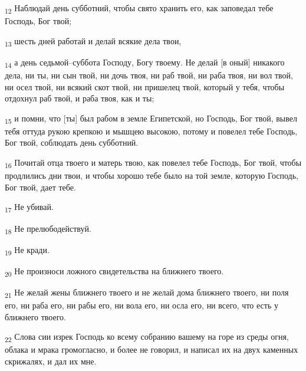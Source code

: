 \begin{tcolorbox}
\textsubscript{12} Наблюдай день субботний, чтобы свято хранить его, как заповедал тебе Господь, Бог твой;
\end{tcolorbox}
\begin{tcolorbox}
\textsubscript{13} шесть дней работай и делай всякие дела твои,
\end{tcolorbox}
\begin{tcolorbox}
\textsubscript{14} а день седьмой--суббота Господу, Богу твоему. Не делай [в оный] никакого дела, ни ты, ни сын твой, ни дочь твоя, ни раб твой, ни раба твоя, ни вол твой, ни осел твой, ни всякий скот твой, ни пришелец твой, который у тебя, чтобы отдохнул раб твой, и раба твоя, как и ты;
\end{tcolorbox}
\begin{tcolorbox}
\textsubscript{15} и помни, что [ты] был рабом в земле Египетской, но Господь, Бог твой, вывел тебя оттуда рукою крепкою и мышцею высокою, потому и повелел тебе Господь, Бог твой, соблюдать день субботний.
\end{tcolorbox}
\begin{tcolorbox}
\textsubscript{16} Почитай отца твоего и матерь твою, как повелел тебе Господь, Бог твой, чтобы продлились дни твои, и чтобы хорошо тебе было на той земле, которую Господь, Бог твой, дает тебе.
\end{tcolorbox}
\begin{tcolorbox}
\textsubscript{17} Не убивай.
\end{tcolorbox}
\begin{tcolorbox}
\textsubscript{18} Не прелюбодействуй.
\end{tcolorbox}
\begin{tcolorbox}
\textsubscript{19} Не кради.
\end{tcolorbox}
\begin{tcolorbox}
\textsubscript{20} Не произноси ложного свидетельства на ближнего твоего.
\end{tcolorbox}
\begin{tcolorbox}
\textsubscript{21} Не желай жены ближнего твоего и не желай дома ближнего твоего, ни поля его, ни раба его, ни рабы его, ни вола его, ни осла его, ни всего, что есть у ближнего твоего.
\end{tcolorbox}
\begin{tcolorbox}
\textsubscript{22} Слова сии изрек Господь ко всему собранию вашему на горе из среды огня, облака и мрака громогласно, и более не говорил, и написал их на двух каменных скрижалях, и дал их мне.
\end{tcolorbox}
